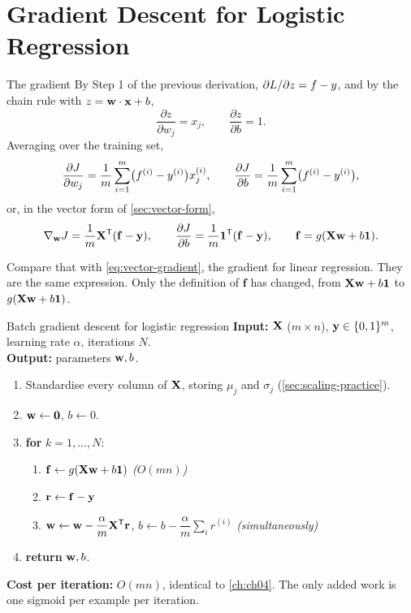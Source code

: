 \section{Gradient Descent for Logistic Regression}
\label{sec:gd-logistic}

\begin{derivation}{The gradient}
By Step 1 of the previous derivation, $\partial L/\partial z = f - y$, and by
the chain rule with $z = \mathbf{w}\cdot\mathbf{x} + b$,
\[
  \frac{\partial z}{\partial w_j} = x_j, \qquad \frac{\partial z}{\partial b} = 1 .
\]
Averaging over the training set,
\[
  \frac{\partial J}{\partial w_j}
  = \frac1m\sum_{i=1}^{m}\bigl(f^{(i)}-y^{(i)}\bigr)x^{(i)}_{j},
  \qquad
  \frac{\partial J}{\partial b}
  = \frac1m\sum_{i=1}^{m}\bigl(f^{(i)}-y^{(i)}\bigr),
\]
or, in the vector form of \cref{sec:vector-form},
\[
  \nabla_{\mathbf{w}} J = \frac1m \mathbf{X}^{\mathsf{T}}(\mathbf{f}-\mathbf{y}),
  \qquad
  \frac{\partial J}{\partial b} = \frac1m \mathbf{1}^{\mathsf{T}}(\mathbf{f}-\mathbf{y}),
  \qquad \mathbf{f} = g(\mathbf{X}\mathbf{w} + b\mathbf{1}).
\]
\end{derivation}

Compare that with \cref{eq:vector-gradient}, the gradient for linear regression.
They are the same expression. Only the definition of $\mathbf{f}$ has changed,
from $\mathbf{X}\mathbf{w} + b\mathbf{1}$ to $g(\mathbf{X}\mathbf{w} + b\mathbf{1})$.

\begin{algorithmbox}{Batch gradient descent for logistic regression}
\textbf{Input:} $\mathbf{X}$ ($m\times n$), $\mathbf{y} \in \{0,1\}^m$, learning rate
$\alpha$, iterations $N$.\\
\textbf{Output:} parameters $\mathbf{w}, b$.

\begin{enumerate}\setlength{\itemsep}{1pt}
  \item Standardise every column of $\mathbf{X}$, storing $\mu_j$ and $\sigma_j$
        (\cref{sec:scaling-practice}).
  \item $\mathbf{w} \leftarrow \mathbf{0}$, \quad $b \leftarrow 0$.
  \item \textbf{for} $k = 1,\dots,N$:
  \begin{enumerate}\setlength{\itemsep}{1pt}
    \item $\mathbf{f} \leftarrow g(\mathbf{X}\mathbf{w} + b\mathbf{1})$
          \hfill \emph{($O(mn)$)}
    \item $\mathbf{r} \leftarrow \mathbf{f} - \mathbf{y}$
    \item $\mathbf{w} \leftarrow \mathbf{w} - \dfrac{\alpha}{m}\mathbf{X}^{\mathsf{T}}\mathbf{r}$,
          \quad
          $b \leftarrow b - \dfrac{\alpha}{m}\sum_i r^{(i)}$
          \hfill \emph{(simultaneously)}
  \end{enumerate}
  \item \textbf{return} $\mathbf{w}, b$.
\end{enumerate}

\textbf{Cost per iteration:} $O(mn)$, identical to
\cref{ch:ch04}. The only added work is one sigmoid per example per iteration.
\end{algorithmbox}

